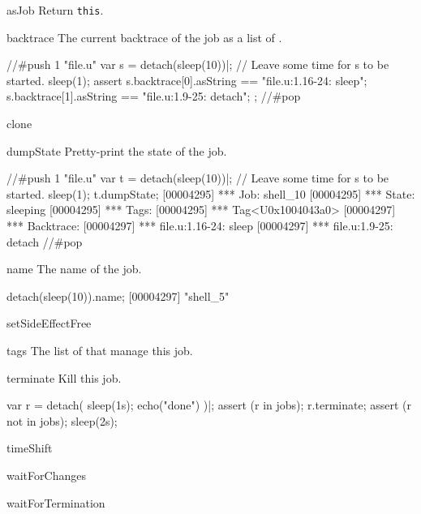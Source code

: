 \begin{urbiscriptapi}
\item[asJob]
  Return \lstinline|this|.

\item[backtrace] The current backtrace of the job as a list of
  .

\begin{urbiscript}
//#push 1 "file.u"
var s = detach(sleep(10))|;
// Leave some time for s to be started.
sleep(1);
assert
{
  s.backtrace[0].asString == "file.u:1.16-24: sleep";
  s.backtrace[1].asString == "file.u:1.9-25: detach";
};
//#pop
\end{urbiscript}

\item[clone]

\item[dumpState]
  Pretty-print the state of the job.

\begin{urbiscript}
//#push 1 "file.u"
var t = detach(sleep(10))|;
// Leave some time for s to be started.
sleep(1);
t.dumpState;
[00004295] *** Job: shell_10
[00004295] ***   State: sleeping
[00004295] ***   Tags:
[00004295] ***     Tag<U0x1004043a0>
[00004297] ***   Backtrace:
[00004297] ***     file.u:1.16-24: sleep
[00004297] ***     file.u:1.9-25: detach
//#pop
\end{urbiscript}

\item[name]  The name of the job.
\begin{urbiscript}
detach(sleep(10)).name;
[00004297] "shell_5"
\end{urbiscript}

\item[setSideEffectFree]


\item[tags] The list of  that manage this job.

\item[terminate]  Kill this job.
\begin{urbiscript}
var r = detach({ sleep(1s); echo("done") })|;
assert (r in jobs);
r.terminate;
assert (r not in jobs);
sleep(2s);
\end{urbiscript}

\item[timeShift]

\item[waitForChanges]

\item[waitForTermination]

\end{urbiscriptapi}


